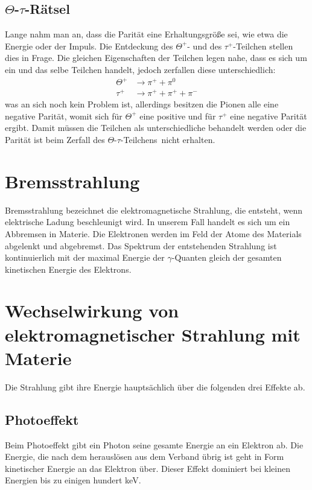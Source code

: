 \documentclass[twoside,colorback,accentcolor=tud4c,11pt]{tudreport}
\begin{document}
\subsection{$\Theta$-$\tau$-Rätsel}
Lange nahm man an, dass die Parität eine Erhaltungsgröße sei, wie etwa die Energie oder der Impuls. Die Entdeckung des $ \Theta^+ $- und des $ \tau^+ $-Teilchen stellen dies in Frage. Die gleichen Eigenschaften der Teilchen legen nahe, dass es sich um ein und das selbe Teilchen handelt, jedoch zerfallen diese unterschiedlich:
\begin{align}
\Theta^+&\rightarrow\pi^++\pi^0\\
\tau^+&\rightarrow\pi^++\pi^++\pi^-
\end{align}
was an sich noch kein Problem ist, allerdings besitzen die Pionen alle eine negative Parität, womit sich für $\Theta^+$ eine positive und für $\tau^+$ eine negative Parität ergibt. Damit müssen die Teilchen als unterschiedliche behandelt werden oder die Parität ist beim Zerfall des \glqq $\Theta$-$\tau$-Teilchens\grqq\, nicht erhalten.
\section{Bremsstrahlung}
Bremsstrahlung bezeichnet die elektromagnetische Strahlung, die entsteht, wenn elektrische Ladung beschleunigt wird. In unserem Fall handelt es sich um ein Abbremsen in Materie. Die Elektronen werden im Feld der Atome des Materials abgelenkt und abgebremst. Das Spektrum der entstehenden Strahlung ist kontinuierlich mit der maximal Energie der $ \gamma $-Quanten gleich der gesamten kinetischen Energie des Elektrons.
\section{Wechselwirkung von elektromagnetischer Strahlung mit Materie}
Die Strahlung gibt ihre Energie hauptsächlich über die folgenden drei Effekte ab.
\subsection{Photoeffekt}
Beim Photoeffekt gibt ein Photon seine gesamte Energie an ein Elektron ab. Die Energie, die nach dem herauslösen aus dem Verband übrig ist geht in Form kinetischer Energie an das Elektron über. Dieser Effekt dominiert bei kleinen Energien bis zu einigen hundert keV.
\end{document}
